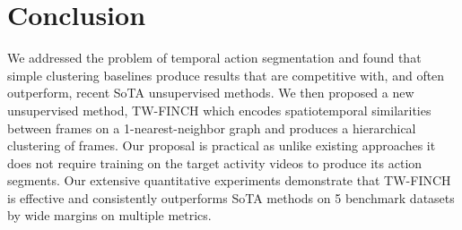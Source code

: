 \documentclass[10pt,twocolumn,letterpaper]{article}
\begin{document}
 \section{Conclusion}\label{sec:conclusion}
We addressed the problem of temporal action segmentation and found that simple clustering baselines produce results that are competitive with, and often outperform, recent SoTA unsupervised methods. We then proposed a new unsupervised method, TW-FINCH which encodes spatiotemporal similarities between frames on a 1-nearest-neighbor graph and produces a hierarchical clustering of frames. Our proposal is practical as unlike existing approaches it does not require training on the target activity videos to produce its action segments. Our extensive quantitative experiments demonstrate that TW-FINCH is effective and consistently outperforms SoTA methods on 5 benchmark datasets by wide margins on multiple metrics.


%
 



{\small


}
\end{document}
